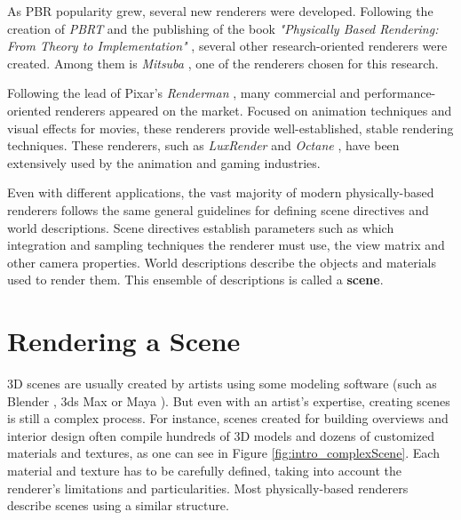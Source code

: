 As PBR popularity grew, several new renderers were developed.
Following the creation of \textit{PBRT} and the publishing of the book 
\textit{"Physically Based Rendering: From Theory to Implementation"} 
\cite{pbrt}, several other research-oriented renderers were created. Among them 
is \textit{Mitsuba} \cite{mitsuba}, one of the renderers chosen for this research.

Following the lead of Pixar's \textit{Renderman} \cite{renderman}, many 
commercial and performance-oriented renderers appeared on the market. Focused on 
animation techniques and visual effects for movies, these renderers provide 
well-established, stable rendering techniques. These renderers, such as \textit{LuxRender} \cite{luxrender} and \textit{Octane} \cite{octane}, 
have been extensively used by the animation and gaming industries.

Even with different applications, the vast majority of modern physically-based renderers 
follows the same general guidelines for defining scene directives and world 
descriptions. Scene directives establish parameters such as which integration 
and sampling techniques the renderer must use, the view matrix and other camera 
properties. World descriptions describe the objects and  
materials used to render them. This ensemble of descriptions is called a \textbf{scene}.

\section{Rendering a Scene}
%
3D scenes are usually created by artists using some modeling 
software (such as Blender \cite{blender}, 3ds Max \cite{3dsmax} or Maya \cite{maya}).
%
But even with an artist’s expertise, creating scenes is still a complex process. 
For instance, scenes created for building overviews and interior design often 
compile hundreds of 3D models and dozens of customized materials and textures, 
as one can see in Figure \ref{fig:intro_complexScene}. Each material and texture 
has to be carefully defined, taking into account the renderer's limitations and 
particularities.
%
Most physically-based renderers describe scenes using a similar structure.

